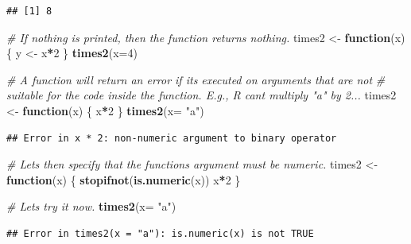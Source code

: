 \documentclass[
]{book}
\newenvironment{Shaded}{\begin{snugshade}}{\end{snugshade}}
\newcommand{\AttributeTok}[1]{\textcolor[rgb]{0.13,0.29,0.53}{#1}}
\newcommand{\CommentTok}[1]{\textcolor[rgb]{0.56,0.35,0.01}{\textit{#1}}}
\newcommand{\ControlFlowTok}[1]{\textcolor[rgb]{0.13,0.29,0.53}{\textbf{#1}}}
\newcommand{\DecValTok}[1]{\textcolor[rgb]{0.00,0.00,0.81}{#1}}
\newcommand{\FunctionTok}[1]{\textcolor[rgb]{0.13,0.29,0.53}{\textbf{#1}}}
\newcommand{\NormalTok}[1]{#1}
\newcommand{\OtherTok}[1]{\textcolor[rgb]{0.56,0.35,0.01}{#1}}
\newcommand{\SpecialCharTok}[1]{\textcolor[rgb]{0.81,0.36,0.00}{\textbf{#1}}}
\newcommand{\StringTok}[1]{\textcolor[rgb]{0.31,0.60,0.02}{#1}}
\begin{document}
\begin{verbatim}
## [1] 8
\end{verbatim}

\begin{Shaded}
\begin{Highlighting}[]
\CommentTok{\# If nothing is printed, then the function returns nothing.}
\NormalTok{times2 }\OtherTok{\textless{}{-}} \ControlFlowTok{function}\NormalTok{(x) \{}
\NormalTok{  y }\OtherTok{\textless{}{-}}\NormalTok{ x}\SpecialCharTok{*}\DecValTok{2}
\NormalTok{\}}
\FunctionTok{times2}\NormalTok{(}\AttributeTok{x=}\DecValTok{4}\NormalTok{)}

\CommentTok{\# A function will return an error if it\textquotesingle{}s executed on arguments that are not}
\CommentTok{\# suitable for the code inside the function. E.g., R can\textquotesingle{}t multiply "a" by 2...}
\NormalTok{times2 }\OtherTok{\textless{}{-}} \ControlFlowTok{function}\NormalTok{(x) \{}
\NormalTok{  x}\SpecialCharTok{*}\DecValTok{2}
\NormalTok{\}}
\FunctionTok{times2}\NormalTok{(}\AttributeTok{x=} \StringTok{"a"}\NormalTok{)}
\end{Highlighting}
\end{Shaded}

\begin{verbatim}
## Error in x * 2: non-numeric argument to binary operator
\end{verbatim}

\begin{Shaded}
\begin{Highlighting}[]
\CommentTok{\# Let\textquotesingle{}s then specify that the function\textquotesingle{}s argument must be numeric.}
\NormalTok{times2 }\OtherTok{\textless{}{-}} \ControlFlowTok{function}\NormalTok{(x) \{}
  \FunctionTok{stopifnot}\NormalTok{(}\FunctionTok{is.numeric}\NormalTok{(x))  }
\NormalTok{  x}\SpecialCharTok{*}\DecValTok{2}
\NormalTok{\}}

\CommentTok{\# Let\textquotesingle{}s try it now.}
\FunctionTok{times2}\NormalTok{(}\AttributeTok{x=} \StringTok{"a"}\NormalTok{)}
\end{Highlighting}
\end{Shaded}

\begin{verbatim}
## Error in times2(x = "a"): is.numeric(x) is not TRUE
\end{verbatim}
\end{document}
